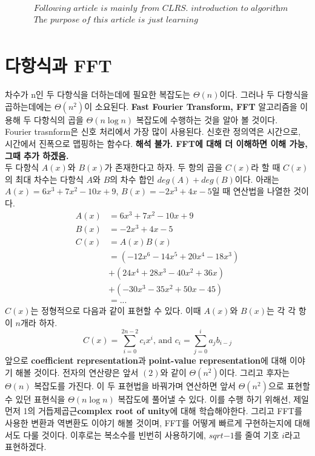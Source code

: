 \documentclass{article}
\begin{document}
\begin{align*}
    &\textit{Following article is mainly from CLRS. introduction to algorithm}\\
    &\textit{The purpose of this article is just learning}\\
\end{align*}
\section{다항식과 FFT}
차수가 n인 두 다항식을 더하는데에 필요한 복잡도는 $\Theta (n)$이다. 그러나 두 다항식을 곱하는데에는 $\Theta (n^2)$이 소요된다. \textbf{Fast Fourier Transform, FFT} 알고리즘을 이용해 두 다항식의 곱을 $\Theta (n \log n)$ 복잡도에 수행하는 것을 알아 볼 것이다. 
\\

Fourier trasnform은 신호 처리에서 가장 많이 사용된다. 신호란 정의역은 시간으로, 시간에서 진폭으로 맵핑하는 함수다. \textbf{ 해석 불가. FFT에 대해 더 이해하면 이해 가능, 그때 추가 하겠음. }\\

두 다항식 $A(x)$와 $B(x)$가 존재한다고 하자. 두 항의 곱을 $C(x)$라 할 때 $C(x)$의 최대 차수는 다항식 $A$와 $B$의 차수 합인 $deg(A) + deg(B)$이다. 아래는 $A(x) = 6x^3+7x^2-10x+9$, $B(x) = -2x^3+4x-5$일 때 연산법을 나열한 것이다.\\
\begin{align*}
    A(x) &= 6x^3 + 7x^2 - 10x + 9\\
    B(x) &= -2x^3 + 4x - 5\\
    C(x) &= A(x)B(x)  \\
    &= (-12x^6 - 14x^5 + 20x^4 - 18x^3)\\
    &+(24x^4 + 28x^3 - 40x^2 + 36x)\\
    &+(-30x^3 - 35x^2 + 50x - 45)\\
    &=...\tag{1}
\end{align*}
$C(x)$는 정형적으로 다음과 같이 표현할 수 있다. 이때 $A(x)$와 $B(x)$는 각 각 항이 $n$개라 하자.\\
\[
C(x)=\sum_{i=0}^{2n-2}c_ix^i \text{, and } c_i = \sum_{j=0}^{i}a_jb_{i-j}\tag{2}
\]
앞으로 \textbf{coefficient representation}과 \textbf{point-value representation}에 대해 이야기 해볼 것이다. 전자의 연산량은 앞서 $(2)$와 같이 $\Theta (n^2)$이다. 그리고 후자는 $\Theta (n)$ 복잡도를 가진다. 이 두 표현법을 바꿔가며 연산하면 앞서 $\Theta (n^2)$으로 표현할 수 있던 표현식을 $\Theta (n \log n)$ 복잡도에 풀어낼 수 있다. 이를 수행 하기 위해선, 제일 먼저 1의 거듭제곱근\textbf{complex root of unity}에 대해 학습해야한다. 그리고 FFT를 사용한 변환과 역변환도 이야기 해볼 것이며, FFT를 어떻게 빠르게 구현하는지에 대해서도 다룰 것이다. 이후로는 복소수를 빈번히 사용하기에, $sqrt{-1}$를 줄여 기호 $i$라고 표현하겠다.
\end{document}
